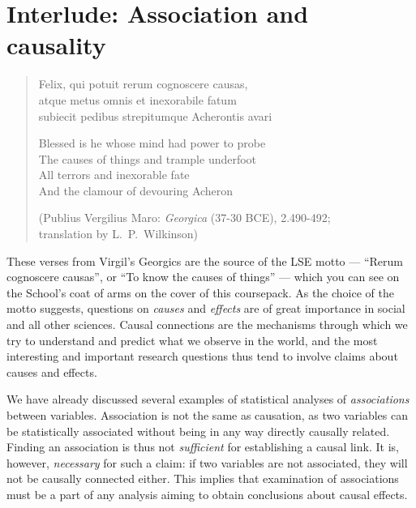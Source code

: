 \newpage
\section{Interlude: Association and causality}
\label{s_regression_causality}


\begin{verse}
Felix, qui potuit rerum cognoscere causas,\\
atque metus omnis et inexorabile fatum\\
subiecit pedibus strepitumque Acherontis avari

\vspace*{1ex}
Blessed is he whose mind had power to probe\\
The causes of things and trample underfoot\\
All terrors and inexorable fate\\
And the clamour of devouring Acheron

\vspace*{1ex}
(Publius Vergilius Maro: \emph{Georgica} (37-30 BCE), 2.490-492;\\
translation by L.\ P.\ Wilkinson)
\end{verse}
These verses from Virgil's Georgics are the source of the LSE motto ---
``Rerum cognoscere causas'', or ``To know the causes of things'' ---
which you can see on the School's coat of arms on the cover of this
coursepack. As the choice of the motto suggests, questions on
\emph{causes} and \emph{effects} are of great importance in social and
all other sciences. Causal connections are the mechanisms through which
we try to understand and predict what we observe in the world, and the
most interesting and important research questions thus tend to involve
claims about causes and effects.

We have already discussed several examples of statistical analyses of
\emph{associations} between variables. Association is not the same as
causation, as two variables can be statistically associated without
being in any way directly causally related. Finding an association is
thus not \emph{sufficient} for establishing a causal link. It is,
however, \emph{necessary} for such a claim: if two variables are not
associated, they will not be causally connected either. This implies
that examination of associations must be a part of any analysis aiming
to obtain conclusions about causal effects.

